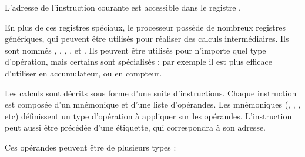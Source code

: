 L'adresse de l'instruction courante est accessible dans le registre \eip.

En plus de ces registres spéciaux, le processeur possède de nombreux registres
génériques, qui peuvent être utilisés pour réaliser des calculs intermédiaires.
Ils sont nommés \eax, \ebx, \ecx, \edx, \esi et \edi. Ils peuvent être utilisés
pour n'importe quel type d'opération, mais certains sont spécialisés : par
exemple il est plus efficace d'utiliser \eax en accumulateur, ou \ecx en
compteur.

Les calculs sont décrits sous forme d'une suite d'instructions. Chaque
instruction est composée d'un mnémonique et d'une liste d'opérandes. Les
mnémoniques (, , , etc) définissent
un type d'opération à appliquer sur les opérandes. L'instruction peut aussi être
précédée d'une étiquette, qui correspondra à son adresse.

\begin{center}
  \shorthandoff{!}
  \shorthandon{!}
\end{center}

Ces opérandes peuvent être de plusieurs types :

